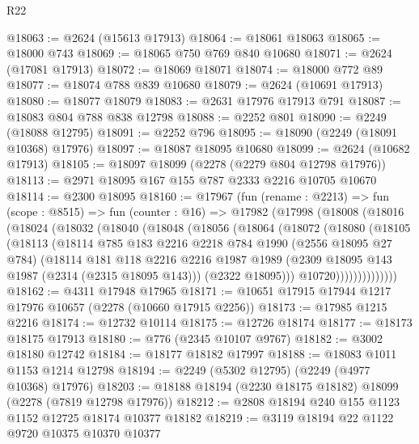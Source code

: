 \begin{lexlean}{R22}
\begin{coremodule}
@18063 := @2624 (@15613 @17913)
@18064 := @18061 @18063
@18065 := @18000 @743
@18069 := @18065 @750 @769 @840 @10680
@18071 := @2624 (@17081 @17913)
@18072 := @18069 @18071
@18074 := @18000 @772 @89
@18077 := @18074 @788 @839 @10680
@18079 := @2624 (@10691 @17913)
@18080 := @18077 @18079
@18083 := @2631 @17976 @17913 @791
@18087 := @18083 @804 @788 @838 @12798
@18088 := @2252 @801
@18090 := @2249 (@18088 @12795)
@18091 := @2252 @796
@18095 := @18090 (@2249 (@18091 @10368) @17976)
@18097 := @18087 @18095 @10680
@18099 := @2624 (@10682 @17913)
@18105 := @18097 @18099 (@2278 (@2279 @804 @12798 @17976))
@18113 := @2971 @18095 @167 @155 @787 @2333 @2216 @10705 @10670
@18114 := @2300 @18095
@18160 := @17967
    (fun (rename : @2213) =>
    fun (scope : @8515) =>
    fun (counter : @16) =>
    @17982
      (@17998
        (@18008
          (@18016
            (@18024
              (@18032
                (@18040
                  (@18048
                    (@18056
                      (@18064
                        (@18072
                          (@18080
                            (@18105
                              (@18113
                                (@18114
                                  @785
                                  @183
                                  @2216
                                  @2218
                                  @784
                                  @1990
                                  (@2556 @18095 @27 @784)
                                  (@18114
                                    @181
                                    @118
                                    @2216
                                    @2216
                                    @1987
                                    @1989
                                    (@2309 @18095 @143 @1987 (@2314 (@2315 @18095 @143)))
                                    (@2322 @18095)))
                                @10720))))))))))))))
@18162 := @4311 @17948 @17965
@18171 := @10651 @17915 @17944 @1217 @17976 @10657 (@2278 (@10660 @17915 @2256))
@18173 := @17985 @1215 @2216
@18174 := @12732 @10114
@18175 := @12726 @18174
@18177 := @18173 @18175 @17913
@18180 := @776 (@2345 @10107 @9767)
@18182 := @3002 @18180 @12742
@18184 := @18177 @18182 @17997
@18188 := @18083 @1011 @1153 @1214 @12798
@18194 := @2249 (@5302 @12795) (@2249 (@4977 @10368) @17976)
@18203 := @18188 @18194 (@2230 @18175 @18182) @18099 (@2278 (@7819 @12798 @17976))
@18212 := @2808 @18194 @240 @155 @1123 @1152 @12725 @18174 @10377 @18182
@18219 := @3119 @18194 @22 @1122 @9720 @10375 @10370 @10377

\end{coremodule}
\end{lexlean}
